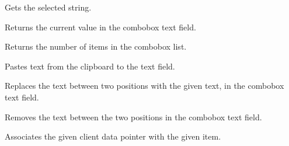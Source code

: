 \label{wxcomboboxgetstringselection}


Gets the selected string.

\label{wxcomboboxgetvalue}


Returns the current value in the combobox text field.

\label{wxcomboboxnumber}


Returns the number of items in the combobox list.

\label{wxcomboboxpaste}


Pastes text from the clipboard to the text field.

\label{wxcomboboxreplace}


Replaces the text between two positions with the given text, in the combobox text field.





\label{wxcomboboxremove}


Removes the text between the two positions in the combobox text field.




\label{wxcomboboxsetclientdata}


Associates the given client data pointer with the given item.

